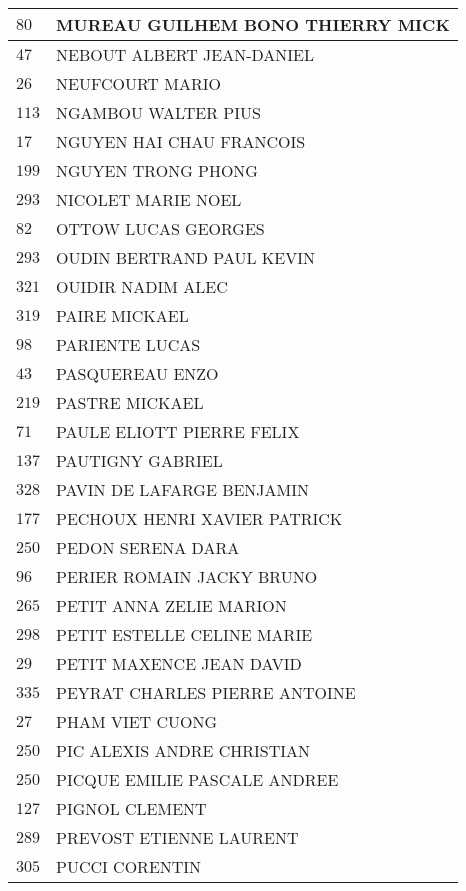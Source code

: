 \begin{xltabular}{\linewidth}{|l|X|}
    \hline
    $80$ & MUREAU GUILHEM BONO THIERRY MICK \\
    \hline
    $47$ & NEBOUT ALBERT JEAN-DANIEL \\
    \hline
    $26$ & NEUFCOURT MARIO \\
    \hline
    $113$ & NGAMBOU WALTER PIUS \\
    \hline
    $17$ & NGUYEN HAI CHAU FRANCOIS \\
    \hline
    $199$ & NGUYEN TRONG PHONG \\
    \hline
    $293$ & NICOLET MARIE NOEL \\
    \hline
    $82$ & OTTOW LUCAS GEORGES \\
    \hline
    $293$ & OUDIN BERTRAND PAUL KEVIN \\
    \hline
    $321$ & OUIDIR NADIM ALEC \\
    \hline
    $319$ & PAIRE MICKAEL \\
    \hline
    $98$ & PARIENTE LUCAS \\
    \hline
    $43$ & PASQUEREAU ENZO \\
    \hline
    $219$ & PASTRE MICKAEL \\
    \hline
    $71$ & PAULE ELIOTT PIERRE FELIX \\
    \hline
    $137$ & PAUTIGNY GABRIEL \\
    \hline
    $328$ & PAVIN DE LAFARGE BENJAMIN \\
    \hline
    $177$ & PECHOUX HENRI XAVIER PATRICK \\
    \hline
    $250$ & PEDON SERENA DARA \\
    \hline
    $96$ & PERIER ROMAIN JACKY BRUNO \\
    \hline
    $265$ & PETIT ANNA ZELIE MARION \\
    \hline
    $298$ & PETIT ESTELLE CELINE MARIE \\
    \hline
    $29$ & PETIT MAXENCE JEAN DAVID \\
    \hline
    $335$ & PEYRAT CHARLES PIERRE ANTOINE \\
    \hline
    $27$ & PHAM VIET CUONG \\
    \hline
    $250$ & PIC ALEXIS ANDRE CHRISTIAN \\
    \hline
    $250$ & PICQUE EMILIE PASCALE ANDREE \\
    \hline
    $127$ & PIGNOL CLEMENT \\
    \hline
    $289$ & PREVOST ETIENNE LAURENT \\
    \hline
    $305$ & PUCCI CORENTIN \\

\end{xltabular}
